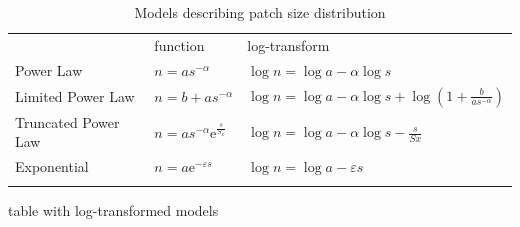 \begin{table}[t!]
\label{tab:fitmodels}
\caption{ Models describing patch size distribution }
\centering
\begin{tabular}{lll}

\toprule
 & function & log-transform \\ \cmidrule(rl){2-2} \cmidrule(rl){3-3}
Power Law &  $n = a s^{- \alpha}$ & $ \log{n} =\log{a} - \alpha \log s$\\
Limited Power Law &  $n = b + a s^{- \alpha} $ & $ \log{n} = \log a - \alpha \log{s} + \log(1+\frac{b}{a s^{-\alpha} })$\\
Truncated Power Law & $n = a s^{- \alpha} \mathrm{e}^{\frac{s}{S_x}}$  & $\log{n} = \log a  - \alpha  \log s  - \frac{s}{Sx}  $ \\
Exponential &  $n = a \mathrm{e}^{-\varepsilon s} $ & $ \log{n} =  \log{a} - \varepsilon s $\\
	\bottomrule
\multicolumn{3}{p{12.5cm}}{\footnotesize  }
	\end{tabular}
\end{table}


table with log-transformed models


